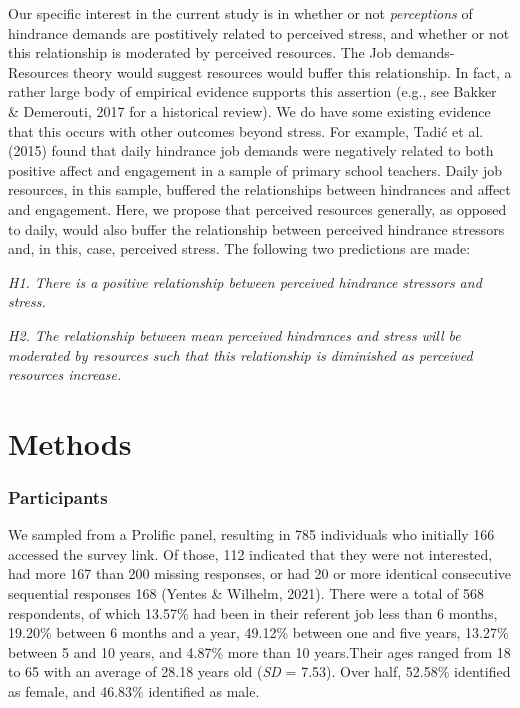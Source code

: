 \documentclass[
  english,
  man]{apa6}
\begin{document}
Our specific interest in the current study is in whether or not \emph{perceptions} of hindrance demands are postitively related to perceived stress, and whether or not this relationship is moderated by perceived resources. The Job demands-Resources theory would suggest resources would buffer this relationship. In fact, a rather large body of empirical evidence supports this assertion (e.g., see Bakker \& Demerouti, 2017 for a historical review). We do have some existing evidence that this occurs with other outcomes beyond stress. For example, Tadić et al. (2015) found that daily hindrance job demands were negatively related to both positive affect and engagement in a sample of primary school teachers. Daily job resources, in this sample, buffered the relationships between hindrances and affect and engagement. Here, we propose that perceived resources generally, as opposed to daily, would also buffer the relationship between perceived hindrance stressors and, in this, case, perceived stress. The following two predictions are made:

\emph{H1. There is a positive relationship between perceived hindrance stressors and stress.}

\emph{H2. The relationship between mean perceived hindrances and stress will be moderated by resources such that this relationship is diminished as perceived resources increase.}

\hypertarget{methods}{%
\section{Methods}\label{methods}}

\hypertarget{participants}{%
\subsubsection{Participants}\label{participants}}

We sampled from a Prolific panel, resulting in 785 individuals who initially 166 accessed the survey link. Of those, 112 indicated that they were not interested, had more 167 than 200 missing responses, or had 20 or more identical consecutive sequential responses 168 (Yentes \& Wilhelm, 2021). There were a total of 568 respondents, of which 13.57\% had been in their referent job less than 6 months, 19.20\% between 6 months and a year, 49.12\% between one and five years, 13.27\% between 5 and 10 years, and 4.87\% more than 10 years.Their ages ranged from 18 to 65 with an average of 28.18 years old (\emph{SD} = 7.53). Over half, 52.58\% identified as female, and 46.83\% identified as male.
\end{document}
